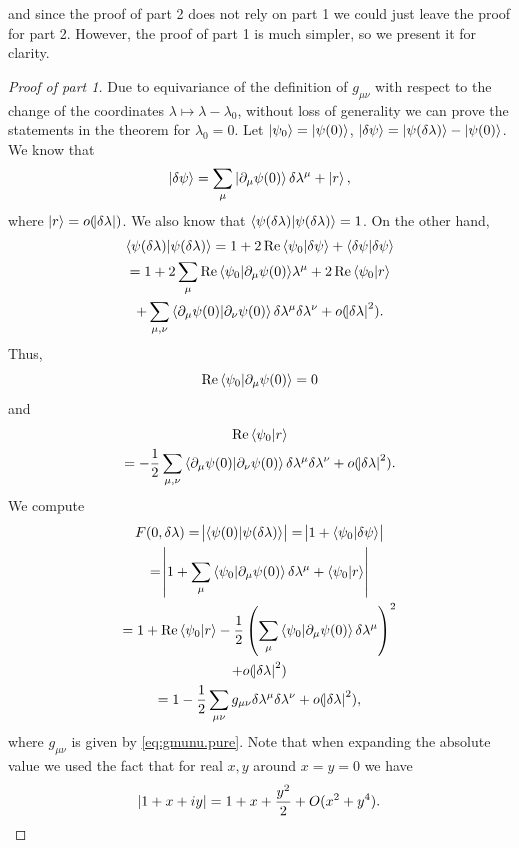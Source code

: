 \documentclass[american,aps,pra,reprint,floatfix,nofootinbib,superscriptaddress]{revtex4-2}
\DeclareMathOperator{\real}{Re}
\begin{document}
and since the proof of part 2 does not rely on 
part 1 
we could just leave the proof for part 2. However, the proof of part 1 is much simpler,
so we 
present it for clarity.
\begin{proof}[Proof of part 1]
  Due to equivariance of the definition of $g_{\mu\nu}$ with respect to
  the change of the coordinates $\lambda \mapsto \lambda - \lambda_0$,
  without loss of generality we can prove the statements in the theorem for
  $\lambda_0 = 0$. Let $\ket{\psi_0} = \ket{\psi(0)}$,
  $\ket{\delta \psi} = \ket{\psi(\delta\lambda)} - \ket{\psi(0)}$.
  We know that
  \begin{equation}
    \ket{\delta \psi} = \sum_{\mu} \ket{\partial_\mu\psi(0)} \delta\lambda^\mu
      + \ket{r},
  \end{equation}
  where $\ket{r} = o(\abs{\delta\lambda})$.
  We also know that $\braket{\psi(\delta\lambda)|\psi(\delta\lambda)} = 1$.
  On the other hand,
  \begin{multline}
    \braket{\psi(\delta\lambda)|\psi(\delta\lambda)} =
    1 + 2\real{\braket{\psi_0|\delta\psi}} + \braket{\delta\psi|\delta\psi}\\
    = 1 + 2\sum_\mu\real{\braket{\psi_0|\partial_\mu\psi(0)}}\lambda^\mu
      + 2\real{\braket{\psi_0|r}}\\
      + \sum_{\mu,\nu}\braket{\partial_\mu\psi(0)|\partial_\nu\psi(0)}
        \delta\lambda^\mu \delta\lambda^\nu
      + o(\abs{\delta\lambda}^2).
  \end{multline}
  Thus,
  \begin{equation}
    \real{\braket{\psi_0|\partial_\mu\psi(0)}} = 0
  \end{equation}
  and
  \begin{multline}
    \real{\braket{\psi_0|r}} \\
      = - \frac12 \sum_{\mu,\nu}
        \braket{\partial_\mu\psi(0)|\partial_\nu\psi(0)}
        \delta\lambda^\mu \delta\lambda^\nu
    + o(\abs{\delta\lambda}^2).
  \end{multline}
  We compute
  \begin{multline}
    F(0, \delta\lambda) = \abs{\braket{\psi(0)|\psi(\delta\lambda)}}
    = \abs{1 + \braket{\psi_0|\delta \psi}} \\
    = \abs{1 + \sum_\mu\braket{\psi_0|\partial_\mu \psi(0)}\delta\lambda^\mu
      + \braket{\psi_0|r}} \\
    = 1 + \real{\braket{\psi_0|r}} - \frac12 \left(
      \sum_\mu\braket{\psi_0|\partial_\mu \psi(0)}\delta\lambda^\mu\right)^2\\
      + o(\abs{\delta\lambda}^2) \\
    = 1 - \frac12 \sum_{\mu\nu} g_{\mu\nu} \delta \lambda^\mu \delta \lambda^\nu
      + o(\abs{\delta \lambda}^2),
  \end{multline}
  where $g_{\mu\nu}$ is given by \eqref{eq:gmunu.pure}.
  Note that when expanding the absolute value we used
  the fact that for real $x,y$ around $x=y=0$ we have
  \begin{equation}
    \abs{1 + x + iy} = 1 + x + \frac{y^2}{2} + O(x^2 + y^4).
  \end{equation}
\end{proof}
\end{document}
